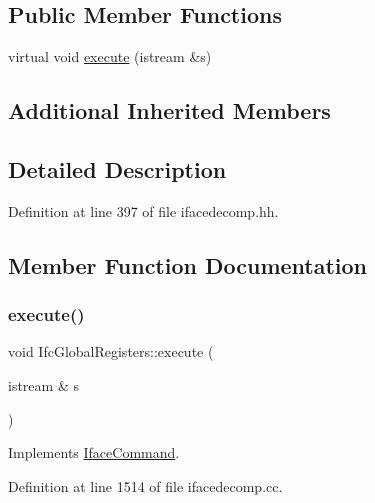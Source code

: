 \subsection*{Public Member Functions}
\begin{DoxyCompactItemize}
\item 
virtual void \mbox{\hyperlink{class_ifc_global_registers_a664345c70b1ae67ce6140acad8de4491}{execute}} (istream \&s)
\end{DoxyCompactItemize}
\subsection*{Additional Inherited Members}


\subsection{Detailed Description}


Definition at line 397 of file ifacedecomp.\+hh.



\subsection{Member Function Documentation}
\mbox{\label{class_ifc_global_registers_a664345c70b1ae67ce6140acad8de4491}} 
\subsubsection{\texorpdfstring{execute()}{execute()}}
{\footnotesize\ttfamily void Ifc\+Global\+Registers\+::execute (\begin{DoxyParamCaption}\item[{istream \&}]{s }\end{DoxyParamCaption})\hspace{0.3cm}{\ttfamily [virtual]}}



Implements \mbox{\hyperlink{class_iface_command_af10e29cee2c8e419de6efe9e680ad201}{Iface\+Command}}.



Definition at line 1514 of file ifacedecomp.\+cc.

